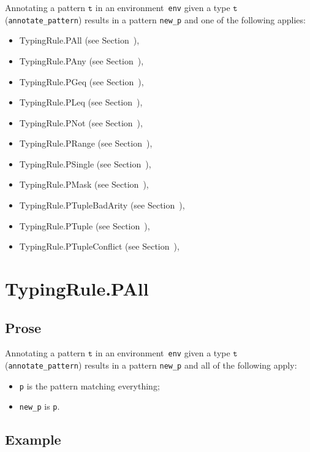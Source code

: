 \documentclass{book}
\newcommand\vt[0]{\texttt{t}}
\begin{document}
\begin{itemize}
Annotating a pattern $\vt$ in an environment~\texttt{env} given a type $\vt$ (\texttt{annotate\_pattern}) results in a pattern \texttt{new\_p} and one of the following applies:
\begin{itemize}
\item TypingRule.PAll (see Section~),
\item TypingRule.PAny (see Section~),
\item TypingRule.PGeq (see Section~),
\item TypingRule.PLeq (see Section~),
\item TypingRule.PNot (see Section~),
\item TypingRule.PRange (see Section~),
\item TypingRule.PSingle (see Section~),
\item TypingRule.PMask (see Section~),
\item TypingRule.PTupleBadArity (see Section~),
\item TypingRule.PTuple (see Section~),
\item TypingRule.PTupleConflict (see Section~),
\end{itemize}

\section{TypingRule.PAll \label{sec:TypingRule.PAll}}

  \subsection{Prose}
   Annotating a pattern $\vt$ in an environment~\texttt{env} given a type $\vt$ (\texttt{annotate\_pattern}) results in a pattern \texttt{new\_p} and all of the following apply:
   \begin{itemize}
   \item \texttt{p} is the pattern matching everything;
   \item \texttt{new\_p} is \texttt{p}.
   \end{itemize}

  \subsection{Example}



\end{itemize}
\end{document}
